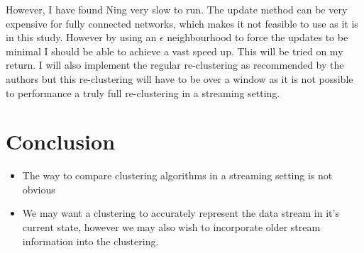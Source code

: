 However, I have found Ning very slow to run. The update method can be very expensive for fully connected networks, which makes it not feasible to use as it is in this study. However by using an $\epsilon$ neighbourhood to force the updates to be minimal I should be able to achieve a vast speed up. This will be tried on my return. I will also implement the regular re-clustering as recommended by the authors but this re-clustering will have to be over a window as it is not possible to performance a truly full re-clustering in a streaming setting.




 
\section{Conclusion}
\label{sec:micro_conc}

\begin{itemize}
\item The way to compare clustering algorithms in a streaming setting is not obvious
\item We may want a clustering to accurately represent the data stream in it's current state, however we may also wish to incorporate older stream information into the clustering.
\end{itemize}


% 
% 





